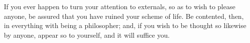 If you ever happen to turn your attention to externals, so as to wish to please
anyone, be  assured that  you have  ruined your scheme  of life.  Be contented,
then, in everything with being a philosopher; and, if you wish to be thought so
likewise by anyone, appear so to yourself, and it will suffice you.
